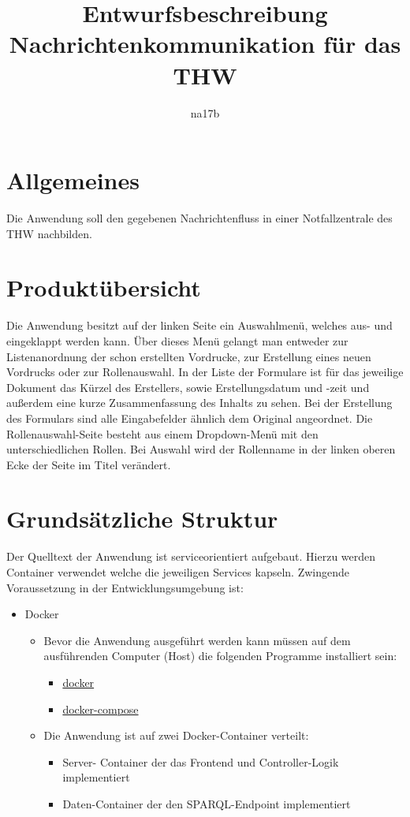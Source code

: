 \documentclass[a4paper,11pt,oneside, titlepage]{article}
\title{Entwurfsbeschreibung\\Nachrichtenkommunikation für das THW}
\author{na17b}
\date{}
\begin{document}
\maketitle


\tableofcontents


\newpage


\section{Allgemeines}
Die Anwendung soll den gegebenen Nachrichtenfluss in einer Notfallzentrale des THW nachbilden.
\section{Produktübersicht}
Die Anwendung besitzt auf der linken Seite ein Auswahlmenü, welches aus- und eingeklappt werden kann. Über dieses Menü gelangt man entweder zur Listenanordnung der schon erstellten Vordrucke, zur Erstellung eines neuen Vordrucks oder zur Rollenauswahl. In der Liste der Formulare ist für das jeweilige Dokument das Kürzel des Erstellers, sowie Erstellungsdatum und -zeit und außerdem eine kurze Zusammenfassung des Inhalts zu sehen. Bei der Erstellung des Formulars sind alle Eingabefelder ähnlich dem Original angeordnet. Die Rollenauswahl-Seite besteht aus einem Dropdown-Menü mit den unterschiedlichen Rollen. Bei Auswahl wird der Rollenname in der linken oberen Ecke der Seite im Titel verändert.
\section{Grundsätzliche Struktur}
Der Quelltext der Anwendung ist serviceorientiert aufgebaut. Hierzu werden Container verwendet welche die jeweiligen Services kapseln. Zwingende Voraussetzung in der Entwicklungsumgebung ist: 
\begin{itemize}
	\item Docker
	\begin{itemize}
		\item Bevor die Anwendung ausgeführt werden kann müssen auf dem ausführenden Computer (Host) die folgenden Programme installiert sein:
		\begin{itemize}
			\item \href{https://www.docker.com/get-docker}{docker}
			\item \href{https://docs.docker.com/compose/}{docker-compose} 
		\end{itemize}
		\item Die Anwendung ist auf zwei Docker-Container verteilt:
		\begin{itemize}
			\item Server-
			Container der das Frontend und Controller-Logik implementiert
			\item Daten-Container der den SPARQL-Endpoint implementiert
		\end{itemize}
		
	\end{itemize}	
\end{itemize}
\end{document}

